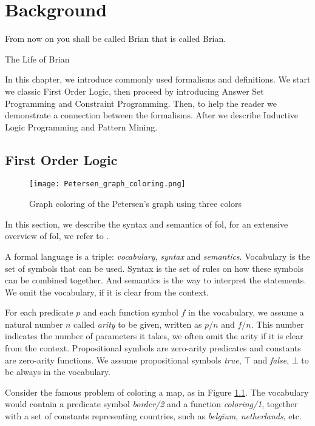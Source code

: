 \chapter{Background} \label{ch:background}
\epigraph{From now on you shall be called Brian that is called Brian.}{The Life of Brian}
In this chapter, we introduce commonly used formalisms and definitions. We start we classic First Order Logic, then proceed by introducing Answer Set Programming and Constraint Programming. Then, to help the reader we demonstrate a connection between the formalisms. After we describe Inductive Logic Programming and Pattern Mining.

\section{First Order Logic}
\begin{figure}[t]
  \centering
  \texttt{[image: Petersen\_graph\_coloring.png]}
  \caption{Graph coloring of the Petersen's graph using three colors}
  \label{fig:petersen_coloring}
\end{figure}
In this section, we describe the syntax and semantics of \acrshort{fol},
for an extensive overview of \acrshort{fol}, we refer to \textcite{fo_overview}.

A formal language is a triple: \textit{vocabulary}, \textit{syntax} and \textit{semantics}. Vocabulary is the set of symbols that can be used. Syntax is the set of rules on how these symbols can be combined together. And semantics is the way to interpret the statements. We omit the vocabulary, if it is clear from the context.

For each predicate $p$ and each function symbol $f$ in the vocabulary, we assume a natural number $n$ called \textit{arity} to be given, written as $p/n$ and $f/n$. This number indicates the number of parameters it takes, we often omit the arity if it is clear from the context. Propositional symbols are zero-arity predicates and constants are zero-arity functions. 
We assume propositional symbols \textit{true}, $\top$ and \textit{false}, $\bot$ to be always in the vocabulary.

\begin{example}\label{example:predicates_and_functions}
  Consider the famous problem of coloring a map, as in Figure \ref{fig:petersen_coloring}. The vocabulary would contain a predicate symbol \textit{border/2} and a function \textit{coloring/1}, together with a set of constants representing countries, such as \textit{belgium}, \textit{netherlands}, etc.
\end{example}

